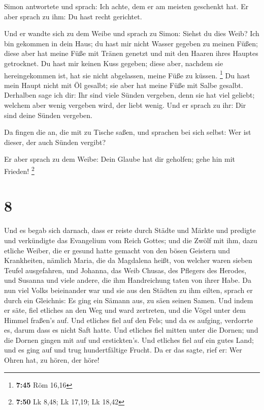  Simon antwortete und sprach: Ich achte, dem er am meisten
geschenkt hat. Er aber sprach zu ihm: Du hast recht gerichtet.

 Und er wandte sich zu dem Weibe und sprach zu Simon:
Siehst du dies Weib? Ich bin gekommen in dein Haus; du hast mir nicht
Wasser gegeben zu meinen Füßen; diese aber hat meine Füße mit Tränen
genetzt und mit den Haaren ihres Hauptes getrocknet.  Du
hast mir keinen Kuss gegeben; diese aber, nachdem sie hereingekommen
ist, hat sie nicht abgelassen, meine Füße zu küssen. \footnote{\textbf{7:45}
  Röm 16,16}  Du hast mein Haupt nicht mit Öl gesalbt; sie
aber hat meine Füße mit Salbe gesalbt.  Derhalben sage ich
dir: Ihr sind viele Sünden vergeben, denn sie hat viel geliebt; welchem
aber wenig vergeben wird, der liebt wenig.  Und er sprach
zu ihr: Dir sind deine Sünden vergeben.

 Da fingen die an, die mit zu Tische saßen, und sprachen
bei sich selbst: Wer ist dieser, der auch Sünden vergibt?

 Er aber sprach zu dem Weibe: Dein Glaube hat dir geholfen;
gehe hin mit Frieden! \footnote{\textbf{7:50} Lk 8,48; Lk 17,19; Lk
  18,42}

\hypertarget{section-2}{%
\section{8}\label{section-2}}

 Und es begab sich darnach, dass er reiste durch Städte und
Märkte und predigte und verkündigte das Evangelium vom Reich Gottes; und
die Zwölf mit ihm,  dazu etliche Weiber, die er gesund hatte
gemacht von den bösen Geistern und Krankheiten, nämlich Maria, die da
Magdalena heißt, von welcher waren sieben Teufel ausgefahren,
 und Johanna, das Weib Chusas, des Pflegers des Herodes, und
Susanna und viele andere, die ihm Handreichung taten von ihrer Habe.
 Da nun viel Volks beieinander war und sie aus den Städten
zu ihm eilten, sprach er durch ein Gleichnis:  Es ging ein
Sämann aus, zu säen seinen Samen. Und indem er säte, fiel etliches an
den Weg und ward zertreten, und die Vögel unter dem Himmel fraßen's auf.
 Und etliches fiel auf den Fels; und da es aufging,
verdorrte es, darum dass es nicht Saft hatte.  Und etliches
fiel mitten unter die Dornen; und die Dornen gingen mit auf und
erstickten's.  Und etliches fiel auf ein gutes Land; und es
ging auf und trug hundertfältige Frucht. Da er das sagte, rief er: Wer
Ohren hat, zu hören, der höre!

